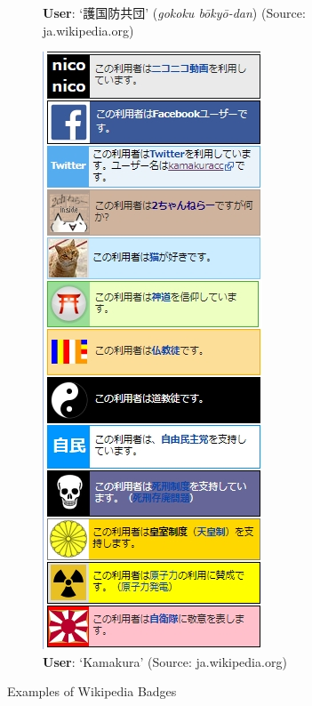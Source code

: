 \documentclass[10pt,british,A4paper,oneside]{memoir}
\begin{document}
\begin{figure}[!htb]
\begin{subfigure}[b]{0.3\textwidth}
 \caption{\textbf{User}: `護国防共団' (\textit{gokoku bōkyō-dan}) (Source: ja.wikipedia.org)}
 \label{fig:defense-corps}
 \end{subfigure}
 \begin{subfigure}[b]{0.3\textwidth}
 \includegraphics[width=\textwidth]{images/wiki/kamakura.jpg}
 \caption{\textbf{User}: `Kamakura' (Source: ja.wikipedia.org)}
 \label{fig:kamakura}
 \end{subfigure}
 \caption{Examples of Wikipedia Badges}\label{fig:badge-examples}
\end{figure}
\end{document}
